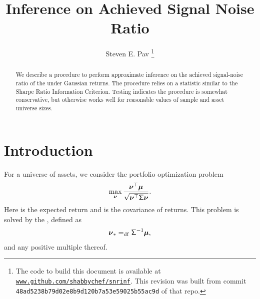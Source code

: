 \documentclass[10pt,a4paper,english]{article}
\theoremstyle{plain}
\theoremstyle{definition}
\theoremstyle{remark}
\providecommand{\gitHash}{48ad5238b79d02e8b9d120b7a53e59025b55ac9d}
\begin{document}
\title{Inference on Achieved Signal Noise Ratio}
\author{Steven E. Pav \thanks{
The code to build this document is available at
\href{http://www.github.com/shabbychef/snrinf}{\normalfont\texttt{www.github.com/shabbychef/snrinf}}.
This revision was built from commit \texttt{\gitHash} of that repo.
}}

\maketitle

\begin{abstract}%
We describe a procedure to perform approximate inference on the
achieved signal-noise ratio of the \txtMP under Gaussian \iid returns.
The procedure relies on a statistic similar to the Sharpe Ratio Information
Criterion. \cite{doi:10.1080/14697688.2020.1718746}
Testing indicates the procedure is somewhat conservative, but
otherwise works well for reasonable values of sample and asset universe sizes.
\end{abstract}%

\section{Introduction}%

For a universe of \nstrat assets, 
we consider the portfolio optimization problem
\begin{equation}
\max_{\pportw }
\frac{\trAB{\pportw}{\pvmu}}{\sqrt{\qform{\pvsig}{\pportw}}}.
\label{eqn:opt_port_I}
\end{equation}
Here \pvmu is the expected return and \pvsig is the covariance of returns.
This problem is solved by the \txtMP, defined as 
\begin{equation}
\pportwopt \defeq \minvAB{\pvsig}{\pvmu},
\end{equation}
and any positive multiple thereof.
\end{document}
